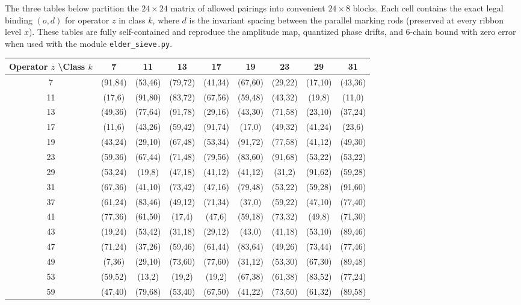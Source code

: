 \documentclass[11pt,a4paper]{article}
\begin{document}
The three tables below partition the \(24 \times 24\) matrix of allowed pairings into convenient \(24 \times 8\) blocks. Each cell contains the exact legal binding \((o,d)\) for operator \(z\) in class \(k\), where \(d\) is the invariant spacing between the parallel marking rods (preserved at every ribbon level \(x\)). These tables are fully self-contained and reproduce the amplitude map, quantized phase drifts, and 6-chain bound with zero error when used with the module \texttt{elder\_sieve.py}.

\begin{table}[htbp]
\centering
\tiny
\begin{tabular}{c|cccccccc}
Operator \(z\) \textbackslash Class \(k\) & 7 & 11 & 13 & 17 & 19 & 23 & 29 & 31 \\
\hline
7  & (91,84) & (53,46) & (79,72) & (41,34) & (67,60) & (29,22) & (17,10) & (43,36) \\
11 & (17,6) & (91,80) & (83,72) & (67,56) & (59,48) & (43,32) & (19,8) & (11,0) \\
13 & (49,36) & (77,64) & (91,78) & (29,16) & (43,30) & (71,58) & (23,10) & (37,24) \\
17 & (11,6) & (43,26) & (59,42) & (91,74) & (17,0) & (49,32) & (41,24) & (23,6) \\
19 & (43,24) & (29,10) & (67,48) & (53,34) & (91,72) & (77,58) & (41,12) & (49,30) \\
23 & (59,36) & (67,44) & (71,48) & (79,56) & (83,60) & (91,68) & (53,22) & (53,22) \\
29 & (53,24) & (19,8) & (47,18) & (41,12) & (41,12) & (31,2) & (91,62) & (59,28) \\
31 & (67,36) & (41,10) & (73,42) & (47,16) & (79,48) & (53,22) & (59,28) & (91,60) \\
37 & (61,24) & (83,46) & (49,12) & (71,34) & (37,0) & (59,22) & (47,10) & (77,40) \\
41 & (77,36) & (61,50) & (17,4) & (47,6) & (59,18) & (73,32) & (49,8) & (71,30) \\
43 & (19,24) & (53,42) & (31,18) & (29,12) & (43,0) & (41,18) & (53,10) & (89,46) \\
47 & (71,24) & (37,26) & (59,46) & (61,44) & (83,64) & (49,26) & (73,44) & (77,46) \\
49 & (7,36) & (29,10) & (73,60) & (77,60) & (31,12) & (53,30) & (67,30) & (89,48) \\
53 & (59,52) & (13,2) & (19,2) & (19,2) & (67,38) & (61,38) & (83,52) & (77,24) \\
59 & (47,40) & (79,68) & (53,40) & (67,50) & (41,22) & (73,50) & (61,32) & (89,58) \\

\end{tabular}
\end{table}
\end{document}
